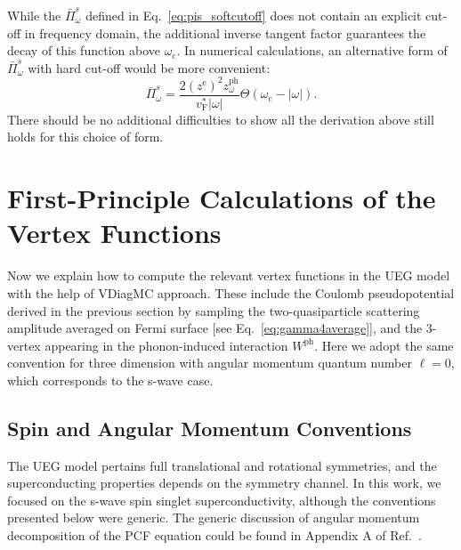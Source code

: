 \documentclass[%
 reprint,
superscriptaddress,
 amsmath,amssymb,
 aps,
prx,
]{revtex4-2}
\newcommand{\txc}{\text{c}}
\newcommand{\txF}{\text{F}}
\newcommand{\txph}{\text{ph}}
\begin{document}
\begin{appendices}
While the $\bar{\Pi}^s_{\omega}$ defined in Eq.~\eqref{eq:pis_softcutoff} does not contain an explicit cut-off in frequency domain, the additional inverse tangent factor guarantees the decay of this function above $\omega_\txc$. 
In numerical calculations, an alternative form of $\bar{\Pi}^s_{\omega}$ with hard cut-off would be more convenient:
\begin{equation}
 \bar{\Pi}^s_{\omega}=\frac{2\left(z^\text{e}\right)^2z^{\txph}_{\omega}}{v_{\txF}^*|\omega|}\Theta(\omega_\txc-\left|\omega\right|).
 \label{eq:pis_hardcutoff}
\end{equation}
There should be no additional difficulties to show all the derivation above still holds for this choice of form.


\section{First-Principle Calculations of the Vertex Functions}

Now we explain how to compute the relevant vertex functions in the UEG model with the help
of VDiagMC approach.
These include the Coulomb pseudopotential derived in the previous section by sampling the
two-quasiparticle scattering amplitude averaged on Fermi surface [see Eq.~\eqref{eq:gamma4average}],
and the 3-vertex appearing in the phonon-induced interaction $W^{\txph}$.
Here we adopt the same convention for three dimension with angular momentum quantum number $\ell=0$, which corresponds to the s-wave case.

\subsection{Spin and Angular Momentum Conventions}
The UEG model pertains full translational and rotational symmetries, 
and the superconducting properties depends on the symmetry channel.
In this work, we focused on the s-wave spin singlet superconductivity, 
although the conventions presented below were generic.
The generic discussion of angular momentum decomposition of the PCF equation could be found in Appendix A of Ref.~\cite{pengcheng}.


\end{appendices}
\end{document}
